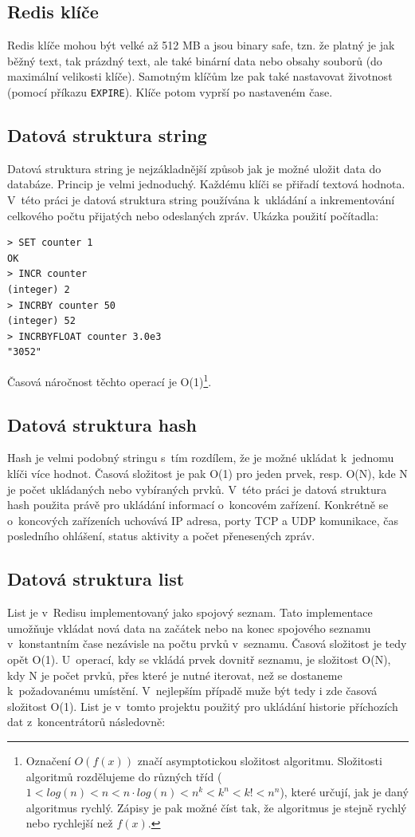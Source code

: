 \subsection{Redis klíče}
Redis klíče mohou být velké až 512 MB a jsou binary safe, tzn. že platný je jak běžný text, tak prázdný text, ale také binární data nebo obsahy souborů (do maximální velikosti klíče). Samotným klíčům lze pak také nastavovat životnost (pomocí příkazu \texttt{EXPIRE}). Klíče potom vyprší po nastaveném čase.

\subsection{Datová struktura string}
Datová struktura string je nejzákladnější způsob jak je možné uložit data do databáze. Princip je velmi jednoduchý. Každému klíči se přiřadí textová hodnota. V~této práci je datová struktura string používána k~ukládání a inkrementování celkového počtu přijatých nebo odeslaných zpráv. Ukázka použití počítadla:

\begin{verbatim}
> SET counter 1
OK
> INCR counter
(integer) 2
> INCRBY counter 50
(integer) 52
> INCRBYFLOAT counter 3.0e3
"3052"
\end{verbatim}

Časová náročnost těchto operací je O(1)\footnote{Označení $O(f(x))$ značí asymptotickou složitost algoritmu. Složitosti algoritmů rozdělujeme do různých tříd ($1 < log(n) < n < n\cdot log(n) < n^k < k^n < k! < n^n$), které určují, jak je daný algoritmus rychlý. Zápisy je pak možné číst tak, že algoritmus je stejně rychlý nebo rychlejší než $f(x)$.}.

\subsection{Datová struktura hash}
Hash je velmi podobný stringu s~tím rozdílem, že je možné ukládat k~jednomu klíči více hodnot. Časová složitost je pak O(1) pro jeden prvek, resp. O(N), kde N je počet ukládaných nebo vybíraných prvků. V~této práci je datová struktura hash použita právě pro ukládání informací o~koncovém zařízení. Konkrétně se o~koncových zařízeních uchovává IP adresa, porty TCP a UDP komunikace, čas posledního ohlášení, status aktivity a počet přenesených zpráv.

\subsection{Datová struktura list}
List je v~Redisu implementovaný jako spojový seznam. Tato implementace umožňuje vkládat nová data na začátek nebo na konec spojového seznamu v~konstantním čase nezávisle na počtu prvků v~seznamu. Časová složitost je tedy opět O(1). U~operací, kdy se vkládá prvek dovnitř seznamu, je složitost O(N), kdy N je počet prvků, přes které je nutné iterovat, než se dostaneme k~požadovanému umístění. V~nejlepším případě muže být tedy i zde časová složitost O(1). List je v~tomto projektu použitý pro ukládání historie příchozích dat z~koncentrátorů následovně:


